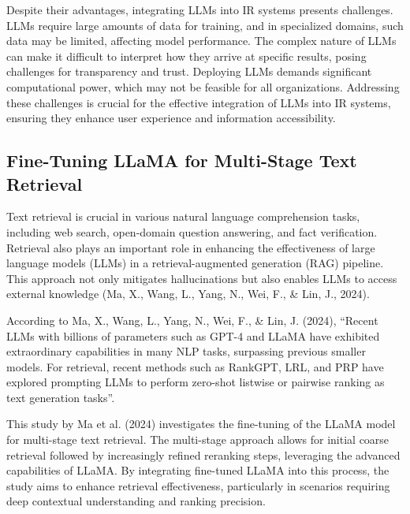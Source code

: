 Despite their advantages, integrating LLMs into IR systems presents challenges. LLMs require large amounts of data for training, and in specialized domains, such data may be limited, affecting model performance. The complex nature of LLMs can make it difficult to interpret how they arrive at specific results, posing challenges for transparency and trust. Deploying LLMs demands significant computational power, which may not be feasible for all organizations. Addressing these challenges is crucial for the effective integration of LLMs into IR systems, ensuring they enhance user experience and information accessibility.



\subsection{Fine-Tuning LLaMA for Multi-Stage Text Retrieval}

\noindent Text retrieval is crucial in various natural language comprehension tasks, including web search, open-domain question answering, and fact verification. Retrieval also plays an important role in enhancing the effectiveness of large language models (LLMs) in a retrieval-augmented generation (RAG) pipeline. This approach not only mitigates hallucinations but also enables LLMs to access external knowledge (Ma, X., Wang, L., Yang, N., Wei, F., & Lin, J., 2024).

According to Ma, X., Wang, L., Yang, N., Wei, F., & Lin, J. (2024), “Recent LLMs with billions of parameters such as GPT-4 and LLaMA have exhibited extraordinary capabilities in many NLP tasks, surpassing previous smaller models. For retrieval, recent methods such as RankGPT, LRL, and PRP have explored prompting LLMs to perform zero-shot listwise or pairwise ranking as text generation tasks”.

This study by Ma et al. (2024) investigates the fine-tuning of the LLaMA model for multi-stage text retrieval. The multi-stage approach allows for initial coarse retrieval followed by increasingly refined reranking steps, leveraging the advanced capabilities of LLaMA. By integrating fine-tuned LLaMA into this process, the study aims to enhance retrieval effectiveness, particularly in scenarios requiring deep contextual understanding and ranking precision.


